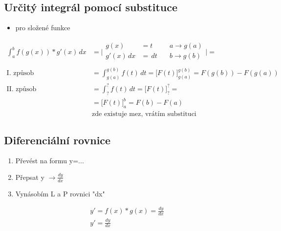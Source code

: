\documentclass{article}
\begin{document}
\subsection{Určitý integrál pomocí substituce}
\begin{itemize}\item pro složené funkce\end{itemize}
\begin{align*}
  \int_a^bf(g(x))*g'(x)\,dx&=
  \Biggr|
    \begin{alignedat}{2}
      g(x) &=t \quad &a \rightarrow g(a) \\
      g'(x)\,dx &=\,dt \quad &b \rightarrow g(b) \\
    \end{alignedat}
  \Biggr| = \\
  \text{I. způsob} &= \int_{g(a)}^{g(b)}f(t)\,dt = \Bigr[F(t)\Bigr]_{g(a)}^{g(b)} = F(g(b))-F(g(a)) \\
  \text{II. způsob} &= \int_?^?f(t)\,dt=\Bigr[F(t)\Bigr]_?^? = \\
  &=\Bigr[F(t)\Bigr]_a^b = F(b)-F(a) \\
  & \text{zde existuje mez, vrátím substituci}
\end{align*}

\subsection{Diferenciální rovnice}
\begin{enumerate}
  \item Převést na formu y=...
  \item Přepsat y $\rightarrow\frac{dy}{dx}$
  \item Vynásobím L a P rovnici "dx"
\end{enumerate}

\begin{align*}
  y'=f(x)*g(x)=\frac{dy}{dx}\\
  y'=\frac{dy}{dx}\\
\end{align*}
\end{document}
